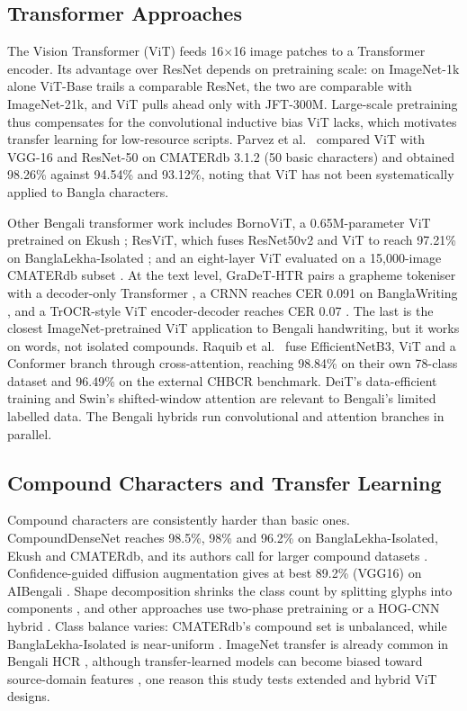\subsection{Transformer Approaches}\label{transformer-approaches}

The Vision Transformer (ViT) \citep{ref22} feeds 16$\times$16 image patches to a Transformer encoder. Its advantage over ResNet depends on pretraining scale: on ImageNet-1k alone ViT-Base trails a comparable ResNet, the two are comparable with ImageNet-21k, and ViT pulls ahead only with JFT-300M. Large-scale pretraining thus compensates for the convolutional inductive bias ViT lacks, which motivates transfer learning for low-resource scripts. Parvez et al.~\citeyearpar{ref17} compared ViT with VGG-16 and ResNet-50 on CMATERdb 3.1.2 (50 basic characters) and obtained 98.26\% against 94.54\% and 93.12\%, noting that ViT has not been systematically applied to Bangla characters.

Other Bengali transformer work includes BornoViT, a 0.65M-parameter ViT pretrained on Ekush \citep{ref18}; ResViT, which fuses ResNet50v2 and ViT to reach 97.21\% on BanglaLekha-Isolated \citep{ref19}; and an eight-layer ViT evaluated on a 15,000-image CMATERdb subset \citep{ref38}. At the text level, GraDeT-HTR pairs a grapheme tokeniser with a decoder-only Transformer \citep{ref20}, a CRNN reaches CER 0.091 on BanglaWriting \citep{ref39}, and a TrOCR-style ViT encoder-decoder reaches CER 0.07 \citep{ref21}. The last is the closest ImageNet-pretrained ViT application to Bengali handwriting, but it works on words, not isolated compounds. Raquib et al.~\citeyearpar{ref25} fuse EfficientNetB3, ViT and a Conformer branch through cross-attention, reaching 98.84\% on their own 78-class dataset and 96.49\% on the external CHBCR benchmark. DeiT's data-efficient training \citep{ref41} and Swin's shifted-window attention \citep{ref42} are relevant to Bengali's limited labelled data. The Bengali hybrids \citep{ref19,ref25} run convolutional and attention branches in parallel.

\subsection{Compound Characters and Transfer Learning}\label{compound-characters}

Compound characters are consistently harder than basic ones. CompoundDenseNet reaches 98.5\%, 98\% and 96.2\% on BanglaLekha-Isolated, Ekush and CMATERdb, and its authors call for larger compound datasets \citep{ref23}. Confidence-guided diffusion augmentation gives at best 89.2\% (VGG16) on AIBengali \citep{ref24}. Shape decomposition shrinks the class count by splitting glyphs into components \citep{ref43}, and other approaches use two-phase pretraining \citep{ref35} or a HOG-CNN hybrid \citep{ref44}. Class balance varies: CMATERdb's compound set is unbalanced, while BanglaLekha-Isolated is near-uniform \citep{ref27}. ImageNet transfer is already common in Bengali HCR \citep{ref11,ref12,ref21}, although transfer-learned models can become biased toward source-domain features \citep{ref17}, one reason this study tests extended and hybrid ViT designs.

